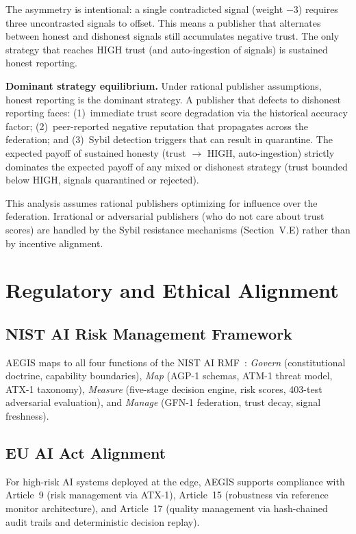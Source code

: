 \documentclass[journal]{IEEEtran}
\begin{document}
The asymmetry is intentional: a single contradicted signal (weight $-3$) requires three uncontrasted signals to offset. This means a publisher that alternates between honest and dishonest signals still accumulates negative trust. The only strategy that reaches HIGH trust (and auto-ingestion of signals) is sustained honest reporting.

\textbf{Dominant strategy equilibrium.} Under rational publisher assumptions, honest reporting is the dominant strategy. A publisher that defects to dishonest reporting faces: (1)~immediate trust score degradation via the historical accuracy factor; (2)~peer-reported negative reputation that propagates across the federation; and (3)~Sybil detection triggers that can result in quarantine. The expected payoff of sustained honesty (trust $\to$ HIGH, auto-ingestion) strictly dominates the expected payoff of any mixed or dishonest strategy (trust bounded below HIGH, signals quarantined or rejected).

This analysis assumes rational publishers optimizing for influence over the federation. Irrational or adversarial publishers (who do not care about trust scores) are handled by the Sybil resistance mechanisms (Section~V.E) rather than by incentive alignment.

\section{Regulatory and Ethical Alignment}

\subsection{NIST AI Risk Management Framework}

AEGIS maps to all four functions of the NIST AI RMF~\cite{nist_airmf}: \textit{Govern} (constitutional doctrine, capability boundaries), \textit{Map} (AGP-1 schemas, ATM-1 threat model, ATX-1 taxonomy), \textit{Measure} (five-stage decision engine, risk scores, 403-test adversarial evaluation), and \textit{Manage} (GFN-1 federation, trust decay, signal freshness).

\subsection{EU AI Act Alignment}

For high-risk AI systems deployed at the edge, AEGIS supports compliance with Article~9 (risk management via ATX-1), Article~15 (robustness via reference monitor architecture), and Article~17 (quality management via hash-chained audit trails and deterministic decision replay).
\end{document}
